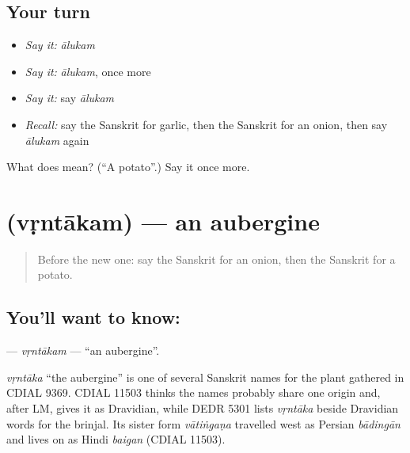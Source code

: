\subsection*{Your turn}
\begin{itemize}
\raggedright
  \item \emph{Say it:} \emph{ālukam}
  \item \emph{Say it:} \emph{ālukam}, once more
  \item \emph{Say it:} say \emph{ālukam}
  \item \emph{Recall:} say the Sanskrit for garlic, then the Sanskrit for an onion, then say \emph{ālukam} again
\end{itemize}

\begin{tcolorbox}[breakable,colback=teal!4,colframe=teal!35!black,title={Before you move on}]
What does  mean? (\textquotedblleft{}A potato\textquotedblright{}.) Say it once more.
\end{tcolorbox}
\section[\texorpdfstring{\sk{वृन्ताकम्} (vṛntākam)}{वृन्ताकम् (vṛntākam)}]{ (vṛntākam) — an aubergine}

\label{lesson:SA-C108-vrntakam}



\begin{quote}
Before the new one: say the Sanskrit for an onion, then the Sanskrit for a potato.
\end{quote}

\subsection*{You'll want to know: }
\textbf{} — \emph{vṛntākam} — \textquotedblleft{}an aubergine\textquotedblright{}.

\begin{cousinweb}
\emph{vṛntāka} \textquotedblleft{}the aubergine\textquotedblright{} is one of several Sanskrit names for the plant gathered in CDIAL 9369. CDIAL 11503 thinks the names probably share one origin and, after LM, gives it as Dravidian, while DEDR 5301 lists \emph{vṛntāka} beside Dravidian words for the brinjal. Its sister form \emph{vātiṅgaṇa} travelled west as Persian \emph{bādingān} and lives on as Hindi \emph{baigan} (CDIAL 11503).
\end{cousinweb}

